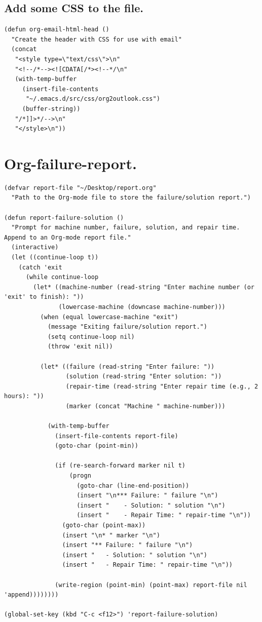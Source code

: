 \documentclass[11pt]{article}
\begin{document}
\subsection{Add some CSS to the file.}
\label{sec:org5ecc052}
\begin{verbatim}
(defun org-email-html-head ()
  "Create the header with CSS for use with email"
  (concat
   "<style type=\"text/css\">\n"
   "<!--/*--><![CDATA[/*><!--*/\n"
   (with-temp-buffer
     (insert-file-contents
      "~/.emacs.d/src/css/org2outlook.css")
     (buffer-string))
   "/*]]>*/-->\n"
   "</style>\n"))
\end{verbatim}
\section{Org-failure-report.}
\label{sec:orgaa8e7bb}
\begin{verbatim}
(defvar report-file "~/Desktop/report.org"
  "Path to the Org-mode file to store the failure/solution report.")

(defun report-failure-solution ()
  "Prompt for machine number, failure, solution, and repair time. Append to an Org-mode report file."
  (interactive)
  (let ((continue-loop t))
    (catch 'exit
      (while continue-loop
        (let* ((machine-number (read-string "Enter machine number (or 'exit' to finish): "))
               (lowercase-machine (downcase machine-number)))
          (when (equal lowercase-machine "exit")
            (message "Exiting failure/solution report.")
            (setq continue-loop nil)
            (throw 'exit nil))

          (let* ((failure (read-string "Enter failure: "))
                 (solution (read-string "Enter solution: "))
                 (repair-time (read-string "Enter repair time (e.g., 2 hours): "))
                 (marker (concat "Machine " machine-number)))

            (with-temp-buffer
              (insert-file-contents report-file)
              (goto-char (point-min))

              (if (re-search-forward marker nil t)
                  (progn
                    (goto-char (line-end-position))
                    (insert "\n*** Failure: " failure "\n")
                    (insert "    - Solution: " solution "\n")
                    (insert "    - Repair Time: " repair-time "\n"))
                (goto-char (point-max))
                (insert "\n* " marker "\n")
                (insert "** Failure: " failure "\n")
                (insert "   - Solution: " solution "\n")
                (insert "   - Repair Time: " repair-time "\n"))

              (write-region (point-min) (point-max) report-file nil 'append))))))))

(global-set-key (kbd "C-c <f12>") 'report-failure-solution)
\end{verbatim}
\end{document}
